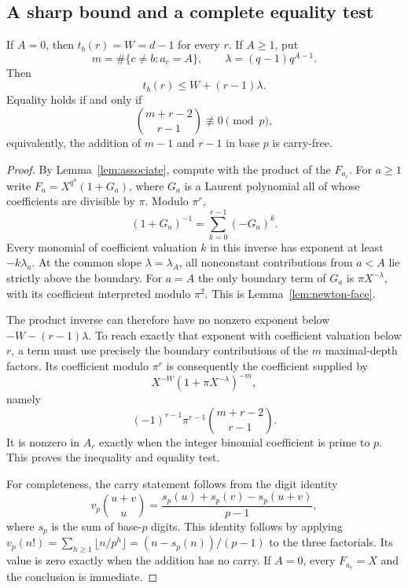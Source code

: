 \subsection{A sharp bound and a complete equality test}

\begin{theorem}\label{thm:jet-carry}
If $A=0$, then $t_b(r)=W=d-1$ for every $r$. If $A\ge1$, put
\[
 m=\#\{c\ne b:a_c=A\},\qquad \lambda=(q-1)q^{A-1}.
\]
Then
\begin{equation}\label{eq:new-jet-bound}
 \boxed{\quad t_b(r)\le W+(r-1)\lambda.\quad}
\end{equation}
Equality holds if and only if
\begin{equation}\label{eq:carry-test}
 \binom{m+r-2}{r-1}\not\equiv0\pmod p,
\end{equation}
equivalently, the addition of $m-1$ and $r-1$ in base $p$ is carry-free.
\end{theorem}

\begin{proof}
By Lemma~\ref{lem:associate}, compute with the product of the $F_{a_c}$. For $a\ge1$ write
$F_a=X^{q^a}(1+G_a)$, where $G_a$ is a Laurent polynomial all of whose coefficients are divisible by $\pi$. Modulo $\pi^r$,
\[
 (1+G_a)^{-1}=\sum_{k=0}^{r-1}(-G_a)^k.
\]
Every monomial of coefficient valuation $k$ in this inverse has exponent at least $-k\lambda_a$. At the common slope $\lambda=\lambda_A$, all nonconstant contributions from $a<A$ lie strictly above the boundary. For $a=A$ the only boundary term of $G_a$ is $\pi X^{-\lambda}$, with its coefficient interpreted modulo $\pi^2$. This is Lemma~\ref{lem:newton-face}.

The product inverse can therefore have no nonzero exponent below $-W-(r-1)\lambda$. To reach exactly that exponent with coefficient valuation below $r$, a term must use precisely the boundary contributions of the $m$ maximal-depth factors. Its coefficient modulo $\pi^r$ is consequently the coefficient supplied by
\[
 X^{-W}(1+\pi X^{-\lambda})^{-m},
\]
namely
\[
 (-1)^{r-1}\pi^{r-1}\binom{m+r-2}{r-1}.
\]
It is nonzero in $A_r$ exactly when the integer binomial coefficient is prime to $p$. This proves the inequality and equality test.

For completeness, the carry statement follows from the digit identity
\[
 v_p\binom{u+v}{u}
 =\frac{s_p(u)+s_p(v)-s_p(u+v)}{p-1},
\]
where $s_p$ is the sum of base-$p$ digits. This identity follows by applying
$v_p(n!)=\sum_{h\ge1}\lfloor n/p^h\rfloor=(n-s_p(n))/(p-1)$ to the three factorials. Its value is zero exactly when the addition has no carry. If $A=0$, every $F_{a_c}=X$ and the conclusion is immediate.
\end{proof}

